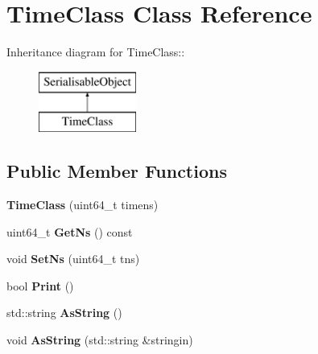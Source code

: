 \hypertarget{classTimeClass}{
\section{TimeClass Class Reference}
\label{classTimeClass}
}
Inheritance diagram for TimeClass::\begin{figure}[H]
\begin{center}
\leavevmode
\includegraphics[height=2cm]{classTimeClass}
\end{center}
\end{figure}
\subsection*{Public Member Functions}
\begin{DoxyCompactItemize}
\item 
\hypertarget{classTimeClass_aa7437c7a5bb6fa3c5e9e568130b833ba}{
{\bfseries TimeClass} (uint64\_\-t timens)}
\label{classTimeClass_aa7437c7a5bb6fa3c5e9e568130b833ba}

\item 
\hypertarget{classTimeClass_abdd3dc5e2c01b4cb82ec9e892cfdff48}{
uint64\_\-t {\bfseries GetNs} () const }
\label{classTimeClass_abdd3dc5e2c01b4cb82ec9e892cfdff48}

\item 
\hypertarget{classTimeClass_ab50e4e660c43ad375648db1a9748ef09}{
void {\bfseries SetNs} (uint64\_\-t tns)}
\label{classTimeClass_ab50e4e660c43ad375648db1a9748ef09}

\item 
\hypertarget{classTimeClass_a06335343185dbcb0555eb17b994b3c50}{
bool {\bfseries Print} ()}
\label{classTimeClass_a06335343185dbcb0555eb17b994b3c50}

\item 
\hypertarget{classTimeClass_a58638d323e604591ecb80b83bafe9aee}{
std::string {\bfseries AsString} ()}
\label{classTimeClass_a58638d323e604591ecb80b83bafe9aee}

\item 
\hypertarget{classTimeClass_a541674ea6b43f30fad16fc4a04a36c37}{
void {\bfseries AsString} (std::string \&stringin)}
\label{classTimeClass_a541674ea6b43f30fad16fc4a04a36c37}

\end{DoxyCompactItemize}

